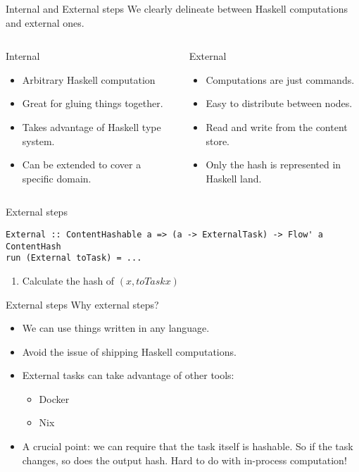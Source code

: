 \documentclass[11pt]{beamer}
\begin{document}
\begin{frame}{Internal and External steps}
We clearly delineate between Haskell computations and external ones.
\begin{columns}
\begin{column}{0.5\textwidth}
\begin{center}
Internal
\begin{itemize}
\item Arbitrary Haskell computation
\item Great for gluing things together.
\item Takes advantage of Haskell type system.
\item Can be extended to cover a specific domain.
\end{itemize}
\end{center}
\end{column}
\begin{column}{0.5\textwidth} 
\begin{center}
External
\begin{itemize}
\item Computations are just commands.
\item Easy to distribute between nodes.
\item Read and write from the content store.
\item Only the hash is represented in Haskell land.
\end{itemize}
\end{center}	
\end{column}
\end{columns}
\end{frame}

\begin{frame}[fragile]{External steps}
\begin{lstlisting}[basicstyle=\tiny, frame=single]
External :: ContentHashable a => (a -> ExternalTask) -> Flow' a ContentHash
run (External toTask) = ...
\end{lstlisting}
\begin{enumerate}
\item Calculate the hash of $(x, toTask x)$
\end{enumerate}
\end{frame}
\begin{frame}{External steps}
Why external steps?
\begin{itemize}
\item We can use things written in any language.
\item Avoid the issue of shipping Haskell computations.
\item External tasks can take advantage of other tools:
\begin{itemize}
\item Docker
\item Nix
\end{itemize}
\item A crucial point: we can require that the task itself is hashable. So if the task changes, so does the output hash. Hard to do with in-process computation!
\end{itemize}
\end{frame}
\end{document}
